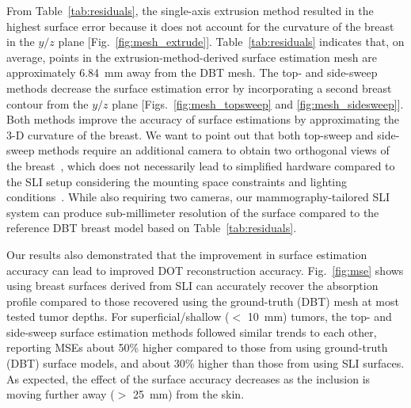 From Table~\ref{tab:residuals}, the single-axis extrusion method resulted in the highest surface error because it does not account for the curvature of the breast in the $y/z$ plane [Fig.~\ref{fig:mesh_extrude}]. Table~\ref{tab:residuals} indicates that, on average, points in the extrusion-method-derived surface estimation mesh are approximately 6.84~mm away from the DBT mesh. The top- and side-sweep methods decrease the surface estimation error by incorporating a second breast contour from the $y/z$ plane [Figs.~\ref{fig:mesh_topsweep} and \ref{fig:mesh_sidesweep}]. Both methods improve the accuracy of surface estimations by approximating the 3-D curvature of the breast. We want to point out that both top-sweep and side-sweep methods require an additional camera to obtain two orthogonal views of the breast~\cite{Pinto2020}, which does not necessarily lead to simplified hardware compared to the SLI setup considering the mounting space constraints and lighting conditions~\cite{Rodriguez2017}. While also requiring two cameras, our mammography-tailored SLI system can produce sub-millimeter resolution of the surface compared to the reference DBT breast model based on Table~\ref{tab:residuals}.

Our results also demonstrated that the improvement in surface estimation accuracy can lead to improved DOT reconstruction accuracy. Fig.~\ref{fig:mse} shows using breast surfaces derived from SLI can accurately recover the absorption profile compared to those recovered using the ground-truth (DBT) mesh at most tested tumor depths. For superficial/shallow ($<$ 10~mm) tumors, the top- and side-sweep surface estimation methods followed similar trends to each other, reporting MSEs about 50\% higher compared to those from using ground-truth (DBT) surface models, and about 30\% higher than those from using SLI surfaces. As expected, the effect of the surface accuracy decreases as the inclusion is moving further away ($>$ 25~mm) from the skin.


